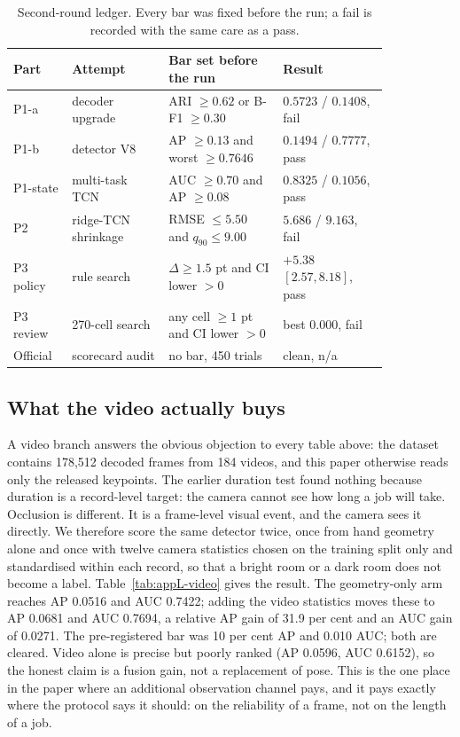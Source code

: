 \begin{table}[H]\centering\scriptsize
\caption{Second-round ledger. Every bar was fixed before the run; a fail is recorded with the same care as a pass.}
\label{tab:appL-round2}
\begin{tabular}{p{0.12\linewidth}p{0.22\linewidth}p{0.26\linewidth}p{0.24\linewidth}}
\toprule
Part & Attempt & Bar set before the run & Result \\
\midrule
P1-a & decoder upgrade & ARI $\geq0.62$ or B-F1 $\geq0.30$ & $0.5723$ / $0.1408$, fail \\
P1-b & detector V8 & AP $\geq0.13$ and worst $\geq0.7646$ & $0.1494$ / $0.7777$, pass \\
P1-state & multi-task TCN & AUC $\geq0.70$ and AP $\geq0.08$ & $0.8325$ / $0.1056$, pass \\
P2 & ridge-TCN shrinkage & RMSE $\leq5.50$ and $q_{90}\leq9.00$ & $5.686$ / $9.163$, fail \\
P3 policy & rule search & $\Delta\geq1.5$ pt and CI lower $>0$ & $+5.38$ $[2.57,8.18]$, pass \\
P3 review & 270-cell search & any cell $\geq1$ pt and CI lower $>0$ & best $0.000$, fail \\
Official & scorecard audit & no bar, 450 trials & clean, n/a \\
\bottomrule\end{tabular}\end{table}

\subsection*{What the video actually buys}
A video branch answers the obvious objection to every table above: the dataset
contains 178,512 decoded frames from 184 videos, and this paper
otherwise reads only the released keypoints. The earlier duration test found nothing
because duration is a record-level target: the camera cannot see how long a job will
take. Occlusion is different. It is a frame-level visual event, and the camera sees it
directly. We therefore score the same detector twice, once from hand geometry alone
and once with twelve camera statistics chosen on the training split only and
standardised within each record, so that a bright room or a dark room does not become
a label. Table~\ref{tab:appL-video} gives the result. The geometry-only arm reaches
AP 0.0516 and AUC 0.7422; adding the video statistics moves these to
AP 0.0681 and AUC 0.7694, a relative AP gain of
31.9 per cent and an AUC gain of 0.0271.
The pre-registered bar was 10 per cent AP and
0.010 AUC; both are cleared. Video alone is precise but poorly
ranked (AP 0.0596, AUC 0.6152), so the honest claim is a
fusion gain, not a replacement of pose. This is the one place in the paper where an
additional observation channel pays, and it pays exactly where the protocol says it
should: on the reliability of a frame, not on the length of a job.


